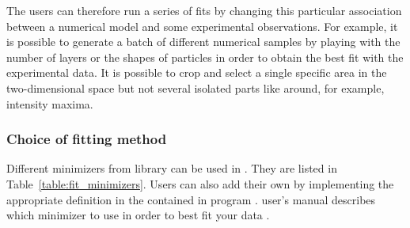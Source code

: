 The users can therefore run a series of fits by
changing this particular association between a numerical model and
some experimental observations. For example, it is possible to generate a batch of different numerical
  samples by playing with the number of layers or the shapes of
  particles in order to obtain the best fit with the experimental
  data. 
It is possible to crop and select a single specific area in the two-dimensional space but
not  several isolated parts like around, for example, intensity maxima.

\subsubsection{Choice of fitting method}

Different minimizers from  library can be used in \BornAgain. They are listed in
Table~\ref{table:fit_minimizers}. Users can also add their own by
implementing the appropriate definition in the  contained in
program .
 user's manual describes which minimizer to use in order to best
fit your data \cite{MinuitURL}. \\




